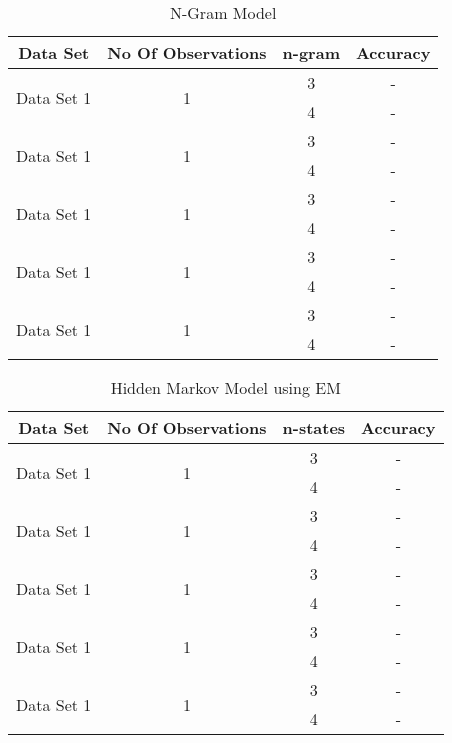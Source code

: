 \documentclass{article} %
\begin{document}
\begin{table}[t]
\caption{N-Gram Model}
\label{N-Gram_model}
\begin{center}
\begin{tabular}{ |c|c|c|c| }
\hline
\multicolumn{1}{|c|}{\bf Data Set} &\multicolumn{1}{|c|}{\bf No Of Observations} &\multicolumn{1}{|c|}{\bf n-gram} &\multicolumn{1}{|c|}{\bf Accuracy}\\
\hline
\multirow{2}{*}{Data Set 1}& \multirow{2}{*}{1} & 3 & - \\
& & 4 & - \\
\hline
\multirow{2}{*}{Data Set 1}& \multirow{2}{*}{1} & 3 & - \\
& & 4 & - \\
\hline
\multirow{2}{*}{Data Set 1}& \multirow{2}{*}{1} & 3 & - \\
& & 4 & - \\
\hline
\multirow{2}{*}{Data Set 1}& \multirow{2}{*}{1} & 3 & - \\
& & 4 & - \\
\hline
\multirow{2}{*}{Data Set 1}& \multirow{2}{*}{1} & 3 & - \\
& & 4 & - \\
\hline
\end{tabular}
\end{center}
\end{table}


\begin{table}[t]
\caption{Hidden Markov Model using EM}
\label{HMM_EM}
\begin{center}
\begin{tabular}{ |c|c|c|c| }
\hline
\multicolumn{1}{|c|}{\bf Data Set} &\multicolumn{1}{|c|}{\bf No Of Observations} &\multicolumn{1}{|c|}{\bf n-states} &\multicolumn{1}{|c|}{\bf Accuracy}\\
\hline
\multirow{2}{*}{Data Set 1}& \multirow{2}{*}{1} & 3 & - \\
& & 4 & - \\
\hline
\multirow{2}{*}{Data Set 1}& \multirow{2}{*}{1} & 3 & - \\
& & 4 & - \\
\hline
\multirow{2}{*}{Data Set 1}& \multirow{2}{*}{1} & 3 & - \\
& & 4 & - \\
\hline
\multirow{2}{*}{Data Set 1}& \multirow{2}{*}{1} & 3 & - \\
& & 4 & - \\
\hline
\multirow{2}{*}{Data Set 1}& \multirow{2}{*}{1} & 3 & - \\
& & 4 & - \\
\hline
\end{tabular}
\end{center}
\end{table}
\end{document}

